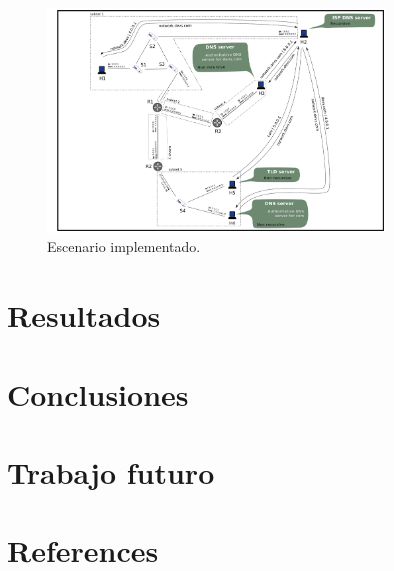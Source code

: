 \documentclass[10pt,a4paper]{article}
\begin{document}
\begin{figure}[!htb]
    \centering
    \includegraphics[width = 0.8\textwidth]{img/png/scenario.png}
    \caption{Escenario implementado.}
    \label{figure: case stady}
\end{figure}

\section{Resultados}
\section{Conclusiones}
\section{Trabajo futuro}
\section{References}


\end{document}
